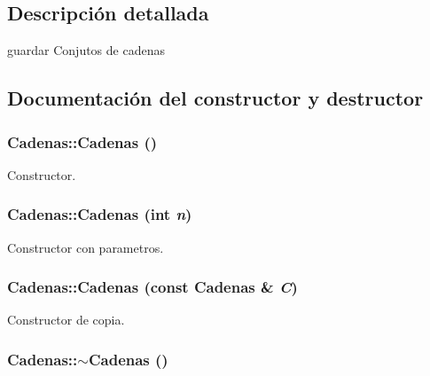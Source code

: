 \subsection{Descripción detallada}
guardar Conjutos de cadenas 

\subsection{Documentación del constructor y destructor}
\hypertarget{class_cadenas_29fe76fae8281718c0e04d56fbbdf6ac}{
\subsubsection[{Cadenas}]{\setlength{\rightskip}{0pt plus 5cm}Cadenas::Cadenas ()}}
\label{class_cadenas_29fe76fae8281718c0e04d56fbbdf6ac}


Constructor. 

\hypertarget{class_cadenas_909303b112dd23c0469003fba49d65e2}{
\subsubsection[{Cadenas}]{\setlength{\rightskip}{0pt plus 5cm}Cadenas::Cadenas (int {\em n})}}
\label{class_cadenas_909303b112dd23c0469003fba49d65e2}


Constructor con parametros. 

\hypertarget{class_cadenas_93aec818276ea7a5c0edead83b40c244}{
\subsubsection[{Cadenas}]{\setlength{\rightskip}{0pt plus 5cm}Cadenas::Cadenas (const {\bf Cadenas} \& {\em C})}}
\label{class_cadenas_93aec818276ea7a5c0edead83b40c244}


Constructor de copia. 

\hypertarget{class_cadenas_58595cf21afd1f9d11544dcf962ebccc}{
\subsubsection[{$\sim$Cadenas}]{\setlength{\rightskip}{0pt plus 5cm}Cadenas::$\sim$Cadenas ()}}
\label{class_cadenas_58595cf21afd1f9d11544dcf962ebccc}


